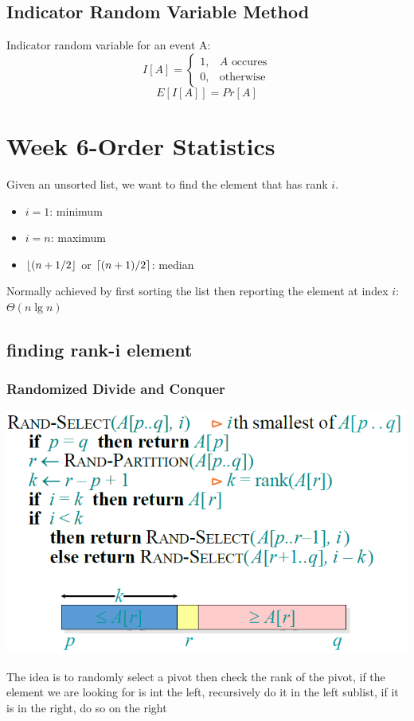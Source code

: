 \documentclass{article}
\DeclarePairedDelimiter\ceil{\lceil}{\rceil}
\DeclarePairedDelimiter\floor{\lfloor}{\rfloor}
\begin{document}
\begin{multicols*}{4}
\subsection{Indicator Random Variable Method}
Indicator random variable for an event A:
$$I[A]=\begin{cases}
1, & A \text{ occures}\\
0, & \text{otherwise}
\end{cases}
$$
$$E[I[A]]=Pr[A]$$

\section{Week 6-Order Statistics}
Given an unsorted list, we want to find the element that has rank $i$.
\begin{itemize}
	\item $i=1$: minimum
	\item $i=n$: maximum
	\item $\floor*{(n+1/2}$ or $\ceil{(n+1)/2}$: median
\end{itemize}

Normally achieved by first sorting the list then reporting the element at index $i$: $\Theta(n \lg n)$

\subsection{finding rank-i element}
\subsubsection{Randomized Divide and Conquer}
\includegraphics[width=\linewidth]{./images/randselect.png}

The idea is to randomly select a pivot then check the rank of the pivot, if the element we are looking for is int the left, recursively do it in the left sublist, if it is in the right, do so on the right


\end{multicols*}
\end{document}
